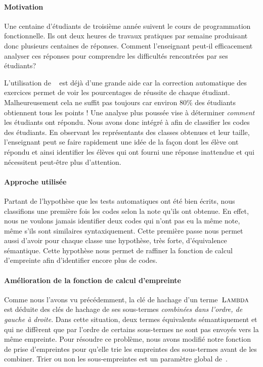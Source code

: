 \paragraph{Motivation}
Une centaine d'étudiants de troisième année suivent le cours de
programmation fonctionnelle. Ils ont deux heures de travaux pratiques
par semaine produisant donc plusieurs centaines de réponses. Comment
l'enseignant peut-il efficacement analyser ces réponses pour
comprendre les difficultés rencontrées par ses étudiants?

L'utilisation de {\LearnOCaml}~\cite{learnocaml} est déjà d'une grande
aide car la correction automatique des exercices permet de voir les
pourcentages de réussite de chaque étudiant. Malheureusement cela ne
suffit pas toujours car environ 80\% des étudiants obtiennent tous les
points ! Une analyse plus poussée vise à déterminer \emph{comment} les
étudiants ont répondu.
%
Nous avons donc intégré {\Asak} à {\LearnOCaml} afin de classifier les
codes des étudiants. En observant les représentants des classes
obtenues et leur taille, l'enseignant peut se faire rapidement une
idée de la façon dont les élève ont répondu et ainsi identifier les
élèves qui ont fourni une réponse inattendue et qui nécessitent
peut-être plus d'attention.

\paragraph{Approche utilisée}
Partant de l'hypothèse que les tests automatiques ont été bien écrits,
nous classifions une première fois les codes selon la note qu'ils ont
obtenue. En effet, nous ne voulons jamais identifier deux codes qui
n'ont pas eu la même note, même s'ils sont similaires
syntaxiquement. Cette première passe nous permet aussi d'avoir pour
chaque classe une hypothèse, très forte, d'équivalence sémantique.
Cette hypothèse nous permet de raffiner la fonction de calcul
d'empreinte afin d'identifier encore plus de codes.

\paragraph{Amélioration de la fonction de calcul d'empreinte}

Comme nous l'avons vu précédemment, la clé de hachage d'un
terme~$\textsc{Lambda}$ est déduite des clés de hachage de ses sous-termes
\textit{combinées dans l'ordre, de gauche à droite}. Dans cette
situation, deux termes équivalents sémantiquement et qui ne diffèrent
que par l'ordre de certains sous-termes ne sont pas envoyés vers la
même empreinte. Pour résoudre ce problème, nous avons modifié notre
fonction de prise d'empreintes pour qu'elle trie les empreintes des
sous-termes avant de les combiner. Trier ou non les sous-empreintes
est un paramètre global de~{\Asak}.

